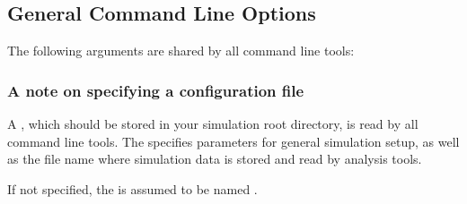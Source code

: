 \documentclass[letterpaper,10pt,english]{sphinxmanual}
\begin{document}
\subsection{General Command Line Options}
\label{\detokenize{users_guide/west_tools:general-command-line-options}}
The following arguments are shared by all command line tools:

\begin{sphinxVerbatim}[commandchars=\\\{\}]
     
            
  
         
       
 
            
\end{sphinxVerbatim}


\subsubsection{A note on specifying a configuration file}
\label{\detokenize{users_guide/west_tools:a-note-on-specifying-a-configuration-file}}
A , which should be stored in your simulation root
directory, is read by all command line tools. The 
specifies parameters for general simulation setup, as well as the  file
name where simulation data is stored and read by analysis tools.

If not specified, the  is assumed to be named
.
\end{document}
